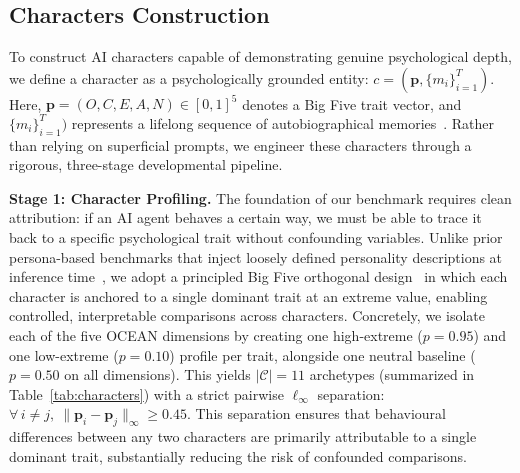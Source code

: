 \documentclass{article}
\begin{document}
\subsection{Characters Construction}
\label{sec:character}

To construct AI characters capable of demonstrating genuine psychological depth, we define a character as a psychologically grounded entity: \(c=(\mathbf{p}, \{m_i\}_{i=1}^{T})\). Here,
$\mathbf{p} = (O, C, E, A, N) \in [0,1]^5$ denotes a Big Five trait vector, and \(\{m_i\}_{i=1}^{T})\) represents a lifelong sequence of autobiographical memories~\cite{singer1995seeing}. 
Rather than relying on superficial prompts, we engineer these characters through a rigorous, three-stage developmental pipeline.

\textbf{Stage 1: Character Profiling.}
The foundation of our benchmark requires clean attribution: if an AI agent behaves a certain way, we must be able to trace it back to a specific psychological trait without confounding variables. Unlike prior persona-based benchmarks that inject loosely defined personality descriptions at inference time~\citep{shao2023character,jiang2024personallm}, we adopt a principled Big Five orthogonal design~\citep{mccrae1992introduction} in which each character is anchored to a single dominant trait at an extreme value, enabling controlled, interpretable comparisons across characters.
Concretely, we isolate each of the five OCEAN dimensions by creating one high-extreme ($p = 0.95$) and one low-extreme ($p = 0.10$) profile per trait, alongside one neutral baseline ($p = 0.50$ on all dimensions). This yields $|\mathcal{C}| = 11$ archetypes (summarized in Table~\ref{tab:characters}) with a strict pairwise $\ell_\infty$ separation: $\forall\, i \neq j,\ \|\mathbf{p}_i - \mathbf{p}_j\|_\infty \geq 0.45$.
This separation ensures that behavioural differences between any two characters are primarily attributable to a single dominant trait, substantially reducing the risk of confounded comparisons.
\end{document}
